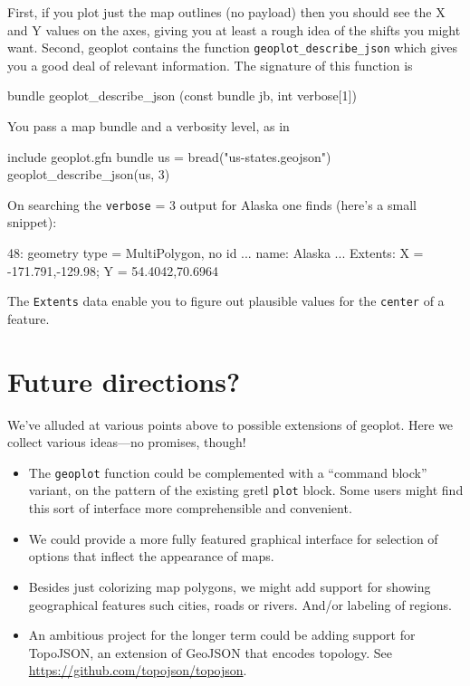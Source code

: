 \documentclass{article}
\begin{document}
First, if you plot just the map outlines (no payload) then you should
see the X and Y values on the axes, giving you at least a rough idea
of the shifts you might want. Second, \textsf{geoplot} contains the
function \texttt{geoplot\_describe\_json} which gives you a good deal
of relevant information. The signature of this function is
\begin{code}
bundle geoplot_describe_json (const bundle jb, int verbose[1])
\end{code}
You pass a map bundle and a verbosity level, as in
\begin{code}
include geoplot.gfn
bundle us = bread("us-states.geojson")
geoplot_describe_json(us, 3)
\end{code}
On searching the \texttt{verbose} = 3 output for Alaska one finds
(here's a small snippet):
\begin{code}
  48: geometry type = MultiPolygon, no id
        ...
        name: Alaska
        ...
        Extents: X = {-171.791,-129.98}; Y = {54.4042,70.6964}
\end{code}
The \texttt{Extents} data enable you to figure out plausible
values for the \texttt{center} of a feature.

\section{Future directions?}
\label{sec:future}

We've alluded at various points above to possible extensions of
\textsf{geoplot}. Here we collect various ideas---no promises, though!

\begin{itemize}
\item The \texttt{geoplot} function could be complemented with a
  ``command block'' variant, on the pattern of the existing gretl
  \texttt{plot} block. Some users might find this sort of interface
  more comprehensible and convenient.
\item We could provide a more fully featured graphical interface for
  selection of options that inflect the appearance of maps.
\item Besides just colorizing map polygons, we might add support
  for showing geographical features such cities, roads or rivers.
  And/or labeling of regions.
\item An ambitious project for the longer term could be adding support
  for TopoJSON, an extension of GeoJSON that encodes topology. See
  \url{https://github.com/topojson/topojson}.
\end{itemize}
\end{document}
